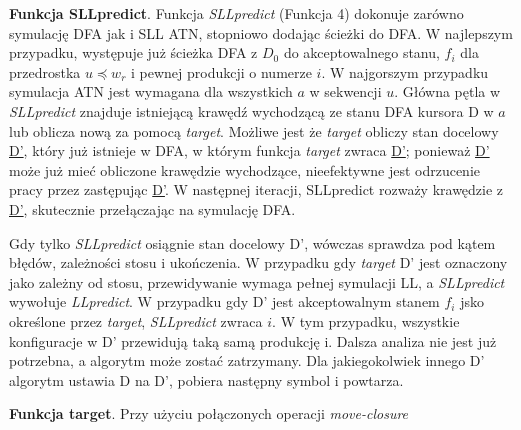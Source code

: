 \par
\textbf{Funkcja SLLpredict}. Funkcja \textit{SLLpredict} (Funkcja 4) dokonuje zarówno symulację
DFA jak i SLL ATN, stopniowo dodając ścieżki do DFA.
W najlepszym przypadku, występuje już ścieżka DFA z $D_0$ do akceptowalnego stanu, $f_i$
dla przedrostka $u \preceq w_r$ i pewnej produkcji o numerze $i$.
W najgorszym przypadku symulacja ATN jest wymagana dla wszystkich $a$ w sekwencji $u$.
Główna pętla w \textit{SLLpredict} znajduje istniejącą krawędź wychodzącą ze stanu DFA
kursora D w $a$ lub oblicza nową za pomocą \textit{target}.
Możliwe jest że \textit{target} obliczy stan docelowy \underline{D'}, który już istnieje w DFA,
w którym funkcja \textit{target} zwraca \underline{D'};
ponieważ \underline{D'} może już mieć obliczone krawędzie wychodzące,
nieefektywne jest odrzucenie pracy przez zastępując \underline{D'}.
W następnej iteracji, SLLpredict rozważy krawędzie z \underline{D'},
skutecznie przełączając na symulację DFA.
\\
\par
Gdy tylko \textit{SLLpredict} osiągnie stan docelowy D', wówczas sprawdza
pod kątem błędów, zależności stosu i ukończenia.
W przypadku gdy \textit{target} D' jest oznaczony jako zależny od stosu,
przewidywanie wymaga pełnej symulacji LL, a \textit{SLLpredict} wywołuje \textit{LLpredict}.
W przypadku gdy D' jest akceptowalnym stanem $f_i$ jsko określone przez \textit{target},
\textit{SLLpredict} zwraca $i$.
W tym przypadku, wszystkie konfiguracje w D' przewidują taką samą produkcję i.
Dalsza analiza nie jest już potrzebna, a algorytm może zostać zatrzymany.
Dla jakiegokolwiek innego D' algorytm ustawia D na D', pobiera następny symbol i powtarza.
\par
\textbf{Funkcja target}. Przy użyciu połączonych operacji \textit{move-closure}
